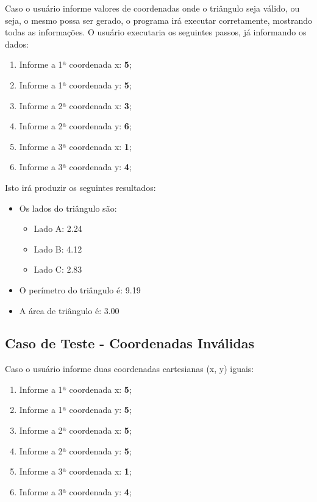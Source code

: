   Caso o usuário informe valores de coordenadas onde o triângulo seja válido, ou seja, o mesmo possa ser gerado, o
  programa irá executar corretamente, mostrando todas as informações. O usuário executaria os seguintes passos, já
  informando os dados:

  \begin{enumerate}
    \item Informe a 1ª coordenada x: \textbf{5};
    \item Informe a 1ª coordenada y: \textbf{5};

    \item Informe a 2ª coordenada x: \textbf{3};
    \item Informe a 2ª coordenada y: \textbf{6};

    \item Informe a 3ª coordenada x: \textbf{1};
    \item Informe a 3ª coordenada y: \textbf{4};
  \end{enumerate}


  Isto irá produzir os seguintes resultados:

  \begin{itemize}
    \item Os lados do triângulo são:
    \begin{itemize}
      \item Lado A: 2.24
      \item Lado B: 4.12
      \item Lado C: 2.83
    \end{itemize}
    \item O perímetro do triângulo é: 9.19
    \item A área de triângulo é: 3.00
  \end{itemize}

  \subsection{Caso de Teste - Coordenadas Inválidas}

  Caso o usuário informe duas coordenadas cartesianas (x, y) iguais:

  \begin{enumerate}
    \item Informe a 1ª coordenada x: \textbf{5};
    \item Informe a 1ª coordenada y: \textbf{5};

    \item Informe a 2ª coordenada x: \textbf{5};
    \item Informe a 2ª coordenada y: \textbf{5};

    \item Informe a 3ª coordenada x: \textbf{1};
    \item Informe a 3ª coordenada y: \textbf{4};
  \end{enumerate}

